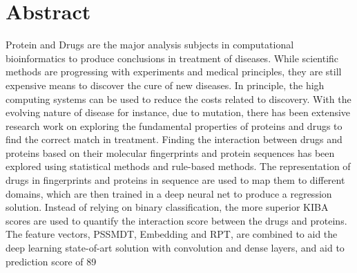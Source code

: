 

\chapter*{Abstract}
\doublespacing
Protein and Drugs are the major analysis subjects in computational bioinformatics to produce conclusions in treatment of diseases. While scientific methods are progressing with experiments and medical principles, they are still expensive means to discover the cure of new diseases. In principle, the high computing systems can be used to reduce the costs related to discovery. With the evolving nature of disease for instance, due to mutation, there has been extensive research work on exploring the fundamental properties of proteins and drugs to find the correct match in treatment. Finding the interaction between drugs and proteins based on their molecular fingerprints and protein sequences has been explored using statistical methods and rule-based methods. The representation of drugs in fingerprints and proteins in sequence are used to map them to different domains, which are then trained in a deep neural net to produce a regression solution. Instead of relying on binary classification, the more superior KIBA scores are used to quantify the interaction score between the drugs and proteins. The feature vectors, PSSMDT, Embedding and RPT, are combined to aid the deep learning state-of-art solution with convolution and dense layers, and aid to prediction score of 89%